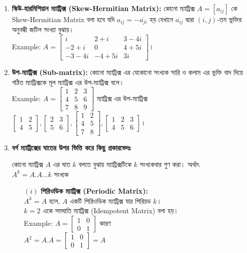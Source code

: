 \begin{enumerate}
	\item \textbf{স্কিউ-হারমিশিয়ান ম্যাট্রিক্স (Skew-Hermitian Matrix):} কোনো ম্যাট্রিক্স $A=[a_{ij}]$ কে Skew-Hermitian Matrix বলা হবে যদি $a_{ij}=-\overline{a_{ji}}$ হয় যেখানে $\overline{a_{ij}}$ দ্বারা $(i,j)$-তম ভুক্তির অনুবন্ধী জটিল সংখ্যা বুঝায়।\\ Example: 
	$A=\left[\begin{array}{ccc}
	i & 2+i & 3-4i \\
	-2+i & 0 & 4+5i \\
	-3-4i & -4+5i & 3i
	\end{array}\right]
	$।
	\\
	\item \textbf{উপ-ম্যাট্রিক্স (Sub-matrix):} কোনো ম্যাট্রিক্স এর যেকোনো সংখ্যক সারি ও কলাম এর ভুক্তি বাদ দিয়ে গঠিত ম্যাট্রিক্সকে মূল ম্যাট্রিক্স এর উপ-ম্যাট্রিক্স বলে।\\ Example: 
	$A=\left[\begin{array}{ccc}
	1 & 2 & 3 \\
	4 & 5 & 6 \\
	7 & 8 & 9
	\end{array}\right]$ ম্যাট্রিক্স এর উপ-ম্যাট্রিক্স\\ 
	$\left[\begin{array}{cc}
	1 & 2 \\
	4 & 5 
	\end{array}\right], 
	\left[\begin{array}{cc}
	2 & 3 \\
	5 & 6 
	\end{array}\right], 
	\left[\begin{array}{cc}
	1 & 2 \\
	4 & 5 \\
	7 & 8 
	\end{array}\right], 
	\left[\begin{array}{ccc}
	1 & 2 & 3\\
	4 & 5 & 6
	\end{array}\right]$।
	\\
	\item \textbf{বর্গ ম্যাট্রিক্সের ঘাতের উপর ভিত্তি করে কিছু প্রকারভেদঃ}
	\begin{tcolorbox}
		কোনো ম্যাট্রিক্স $A$ এর ঘাত $k$ বলতে বুঝায় ম্যাট্রিক্সটিকে $k$ সংখ্যকবার গুণ করা।
		অর্থাৎ $A^k=A.A\dots k\text{ সংখ্যক}$
	\end{tcolorbox}
	\begin{itemize}
		\item[$(i)$] \textbf{পিরিওডিক ম্যাট্রিক্স (Periodic Matrix):}\\ $A^k=A$ হলে, $A$ একটি পিরিওডিক ম্যাট্রিক্স যার পিরিয়ড $k$।\\ $k=2$ একে সমঘাতি ম্যাট্রিক্স (Idempotent Matrix) বলা হয়।\\ Example: $A=\left[\begin{array}{cc}
		1 & 0 \\
		0 & 1
		\end{array}\right]$ কারণ \\
		$A^2=A.A=\left[\begin{array}{cc}
		1 & 0 \\
		0 & 1
		\end{array}\right]=A$ 
		

\end{itemize}
\end{enumerate}
